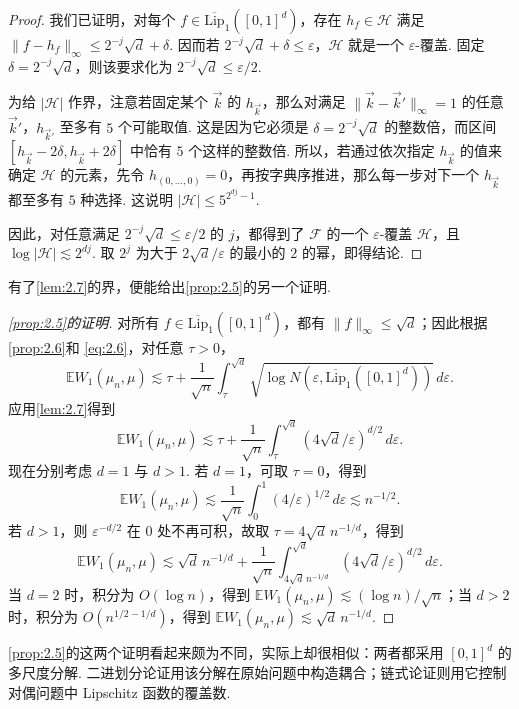 \begin{proof}
我们已证明，对每个 $f\in\overline{\mathrm{Lip}}_1([0,1]^d)$，存在 $h_f\in\mathcal H$ 满足 $\lVert f-h_f\rVert_\infty\le2^{-j}\sqrt d+\delta$. 因而若 $2^{-j}\sqrt d+\delta\le\varepsilon$，$\mathcal H$ 就是一个 $\varepsilon$-覆盖. 固定 $\delta=2^{-j}\sqrt d$，则该要求化为 $2^{-j}\sqrt d\le\varepsilon/2$.

为给 $|\mathcal H|$ 作界，注意若固定某个 $\vec k$ 的 $h_{\vec k}$，那么对满足 $\lVert\vec k-\vec k'\rVert_\infty=1$ 的任意 $\vec k'$，$h_{\vec k'}$ 至多有 $5$ 个可能取值. 这是因为它必须是 $\delta=2^{-j}\sqrt d$ 的整数倍，而区间 $[h_{\vec k}-2\delta,h_{\vec k}+2\delta]$ 中恰有 $5$ 个这样的整数倍. 所以，若通过依次指定 $h_{\vec k}$ 的值来确定 $\mathcal H$ 的元素，先令 $h_{(0,\ldots,0)}=0$，再按字典序推进，那么每一步对下一个 $h_{\vec k}$ 都至多有 $5$ 种选择. 这说明 $|\mathcal H|\le5^{2^{dj}-1}$.

因此，对任意满足 $2^{-j}\sqrt d\le\varepsilon/2$ 的 $j$，都得到了 $\mathcal F$ 的一个 $\varepsilon$-覆盖 $\mathcal H$，且 $\log|\mathcal H|\lesssim2^{dj}$. 取 $2^j$ 为大于 $2\sqrt d/\varepsilon$ 的最小的 $2$ 的幂，即得结论.
\end{proof}
有了\autoref{lem:2.7}的界，便能给出\autoref{prop:2.5}的另一个证明.
\begin{proof}[\autoref{prop:2.5}的证明]
对所有 $f\in\overline{\mathrm{Lip}}_1([0,1]^d)$，都有 $\lVert f\rVert_\infty\le\sqrt d$；因此根据\autoref{prop:2.6}和 \eqref{eq:2.6}，对任意 $\tau>0$，
$$\mathbb EW_1(\mu_n,\mu)\lesssim\tau+\frac1{\sqrt n}\int_\tau^{\sqrt d}\sqrt{\log N(\varepsilon,\overline{\mathrm{Lip}}_1([0,1]^d))}\,d\varepsilon.$$
应用\autoref{lem:2.7}得到
$$\mathbb EW_1(\mu_n,\mu)\lesssim\tau+\frac1{\sqrt n}\int_\tau^{\sqrt d}(4\sqrt d/\varepsilon)^{d/2}\,d\varepsilon.$$
现在分别考虑 $d=1$ 与 $d>1$. 若 $d=1$，可取 $\tau=0$，得到
$$\mathbb EW_1(\mu_n,\mu)\lesssim\frac1{\sqrt n}\int_0^1(4/\varepsilon)^{1/2}\,d\varepsilon\lesssim n^{-1/2}.$$
若 $d>1$，则 $\varepsilon^{-d/2}$ 在 $0$ 处不再可积，故取 $\tau=4\sqrt d\,n^{-1/d}$，得到
$$\mathbb EW_1(\mu_n,\mu)\lesssim\sqrt d\,n^{-1/d}+\frac1{\sqrt n}\int_{4\sqrt d\,n^{-1/d}}^{\sqrt d}(4\sqrt d/\varepsilon)^{d/2}\,d\varepsilon.$$
当 $d=2$ 时，积分为 $O(\log n)$，得到 $\mathbb EW_1(\mu_n,\mu)\lesssim(\log n)/\sqrt n$；当 $d>2$ 时，积分为 $O(n^{1/2-1/d})$，得到 $\mathbb EW_1(\mu_n,\mu)\lesssim\sqrt d\,n^{-1/d}$.
\end{proof}
\autoref{prop:2.5}的这两个证明看起来颇为不同，实际上却很相似：两者都采用 $[0,1]^d$ 的多尺度分解. 二进划分论证用该分解在原始问题中构造耦合；链式论证则用它控制对偶问题中 Lipschitz 函数的覆盖数.

